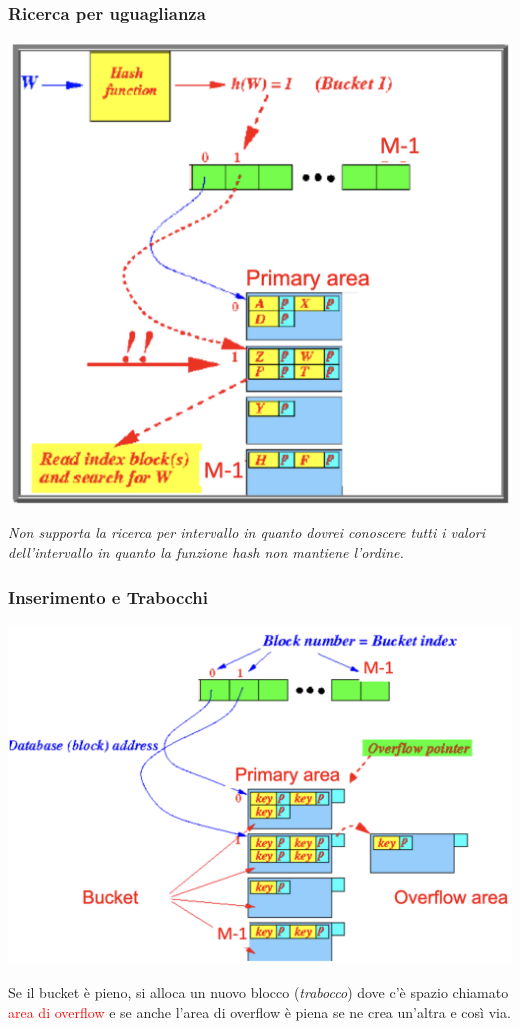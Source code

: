 \documentclass[12pt, a4paper]{report}
\begin{document}
    \subsubsection{Ricerca per uguaglianza}
    \begin{center}
        \includegraphics[scale=0.5]{Appunti Latex/Immagini/indicihashuguaglianza.png}
    \end{center}
    \textit{Non supporta la ricerca per intervallo in quanto dovrei conoscere tutti i valori dell'intervallo in quanto la funzione hash non mantiene l'ordine.}
    \subsubsection{Inserimento e Trabocchi}
    \begin{center}
        \includegraphics[scale=0.5]{Appunti Latex/Immagini/inidicihashinserimento.png}
    \end{center}
    Se il bucket è pieno, si alloca un nuovo blocco (\textit{trabocco}) dove c'è spazio chiamato \textcolor{red}{area di overflow} e se anche l'area di overflow è piena se ne crea un'altra e così via.
\end{document}
